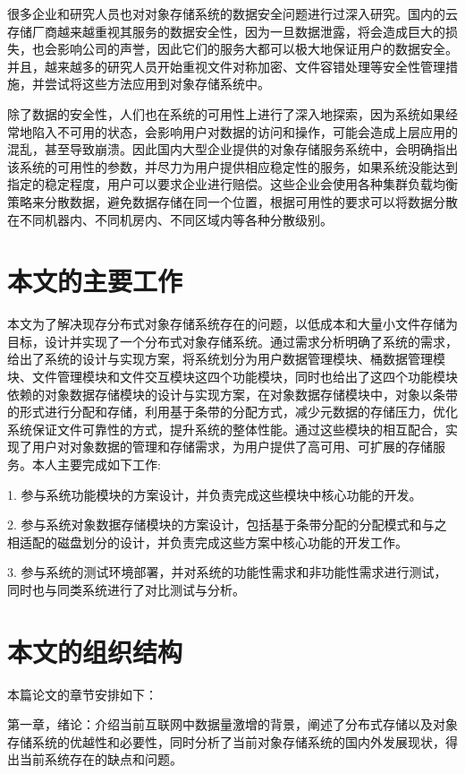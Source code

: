 很多企业和研究人员也对对象存储系统的数据安全问题进行过深入研究。国内的云存储厂商越来越重视其服务的数据安全性，因为一旦数据泄露，将会造成巨大的损失，也会影响公司的声誉，因此它们的服务大都可以极大地保证用户的数据安全。并且，越来越多的研究人员开始重视文件对称加密\cite{32}、文件容错处理等安全性管理措施，并尝试将这些方法应用到对象存储系统中。

除了数据的安全性，人们也在系统的可用性上进行了深入地探索，因为系统如果经常地陷入不可用的状态，会影响用户对数据的访问和操作，可能会造成上层应用的混乱，甚至导致崩溃。因此国内大型企业提供的对象存储服务系统中，会明确指出该系统的可用性的参数，并尽力为用户提供相应稳定性的服务，如果系统没能达到指定的稳定程度，用户可以要求企业进行赔偿。这些企业会使用各种集群负载均衡策略来分散数据，避免数据存储在同一个位置，根据可用性的要求可以将数据分散在不同机器内、不同机房内、不同区域内等各种分散级别。

\section{本文的主要工作}%
本文为了解决现存分布式对象存储系统存在的问题，以低成本和大量小文件存储为目标，设计并实现了一个分布式对象存储系统。通过需求分析明确了系统的需求，给出了系统的设计与实现方案，将系统划分为用户数据管理模块、桶数据管理模块、文件管理模块和文件交互模块这四个功能模块，同时也给出了这四个功能模块依赖的对象数据存储模块的设计与实现方案，在对象数据存储模块中，对象以条带的形式进行分配和存储，利用基于条带的分配方式，减少元数据的存储压力，优化系统保证文件可靠性的方式，提升系统的整体性能。通过这些模块的相互配合，实现了用户对对象数据的管理和存储需求，为用户提供了高可用、可扩展的存储服务。本人主要完成如下工作:

1. 参与系统功能模块的方案设计，并负责完成这些模块中核心功能的开发。

2. 参与系统对象数据存储模块的方案设计，包括基于条带分配的分配模式和与之相适配的磁盘划分的设计，并负责完成这些方案中核心功能的开发工作。

3. 参与系统的测试环境部署，并对系统的功能性需求和非功能性需求进行测试，同时也与同类系统进行了对比测试与分析。

\section{本文的组织结构}%
本篇论文的章节安排如下：

第一章，绪论：介绍当前互联网中数据量激增的背景，阐述了分布式存储以及对象存储系统的优越性和必要性，同时分析了当前对象存储系统的国内外发展现状，得出当前系统存在的缺点和问题。

